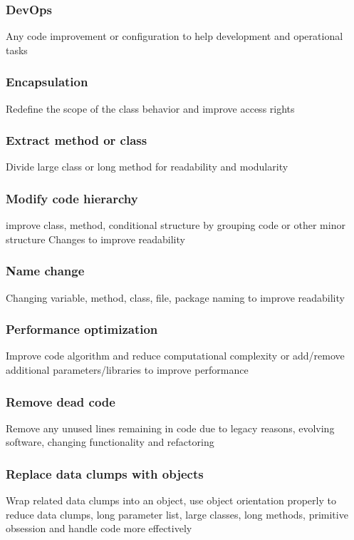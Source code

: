 \subsubsection*{DevOps}
Any code improvement or configuration to help development and operational tasks

\subsubsection*{Encapsulation}
Redefine the scope of the class behavior and improve access rights

\subsubsection*{Extract method or class}
Divide large class or long method for readability and modularity

\subsubsection*{Modify code hierarchy}improve class, method, conditional structure by grouping code or other minor structure Changes to improve readability

\subsubsection*{Name change}
Changing variable, method, class, file, package naming to improve readability

\subsubsection*{Performance optimization}
Improve code algorithm and reduce computational complexity or add/remove additional parameters/libraries to improve performance

\subsubsection*{Remove dead code}
Remove any unused lines remaining in code due to legacy reasons, evolving software, changing functionality and refactoring

\subsubsection*{Replace data clumps with objects}
Wrap related data clumps into an object, use object orientation properly to reduce data clumps, long parameter list, large classes, long methods, primitive obsession and handle code more effectively 


